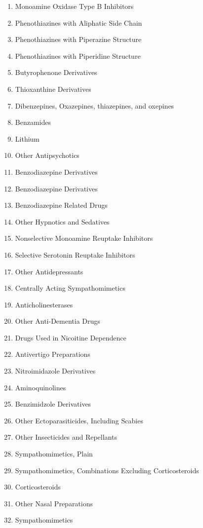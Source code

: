 \documentclass[a4paper,12pt]{article}
\begin{document}
\begin{appendices}
\begin{enumerate}
   			\item Monoamine Oxidase Type B Inhibitors
   			\item Phenothiazines with Aliphatic Side Chain
   			\item Phenothiazines with Piperazine Structure
   			\item Phenothiazines with Piperidine Structure
   			\item Butyrophenone Derivatives
   			\item Thioxanthine Derivatives
   			\item Dibenzepines, Oxazepines, thiazepines, and oxepines
   			\item Benzamides
   			\item Lithium
   			\item Other Antipsychotics
   			\item Benzodiazepine Derivatives
   			\item Benzodiazepine Derivatives
   			\item Benzodiazepine Related Drugs
   			\item Other Hypnotics and Sedatives
   			\item Nonselective Monoamine Reuptake Inhibitors
   			\item Selective Serotonin Reuptake Inhibitors
   			\item Other Antidepressants
   			\item Centrally Acting Sympathomimetics
   			\item Anticholinesterases
   			\item Other Anti-Dementia Drugs
   			\item Drugs Used in Nicoitine Dependence
   			\item Antivertigo Preparations
   			\item Nitroimidazole Derivatives
   			\item Aminoquinolines
   			\item Benzimidzole Derivatives
   			\item Other Ectoparasiticides, Including Scabies
   			\item Other Insecticides and Repellants
   			\item Sympathomimetics, Plain
   			\item Sympathomimetics, Combinations Excluding Corticosteroids
   			\item Corticosteroids
   			\item Other Nasal Preparations
   			\item Sympathomimetics

\end{enumerate}
\end{appendices}
\end{document}
